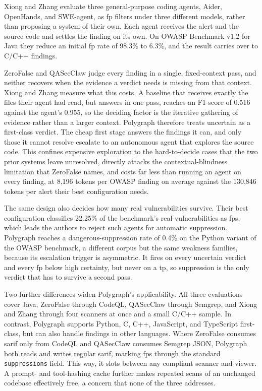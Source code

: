 Xiong and Zhang \cite{xiong2026} evaluate three general-purpose coding agents,
Aider, OpenHands, and SWE-agent, as \ac{fp} filters under three different
models, rather than proposing a system of their own. Each agent receives the
alert and the source code and settles the finding on its own. On OWASP Benchmark
v1.2 for Java they reduce an initial \ac{fp} rate of 98.3\% to 6.3\%, and the
result carries over to C/C++ findings.

ZeroFalse and QASecClaw judge every finding in a single, fixed-context pass, and
neither recovers when the evidence a verdict needs is missing from that context.
Xiong and Zhang measure what this costs. A baseline that receives exactly the
files their agent had read, but answers in one pass, reaches an F1-score of
0.516 against the agent's 0.955, so the deciding factor is the iterative
gathering of evidence rather than a larger context. Polygraph therefore treats
uncertain as a first-class verdict. The cheap first stage answers the findings
it can, and only those it cannot resolve escalate to an autonomous agent that
explores the source code. This confines expensive exploration to the
hard-to-decide cases that the two prior systems leave unresolved, directly
attacks the contextual-blindness limitation that ZeroFalse names, and costs far
less than running an agent on every finding, at 8,196 tokens per OWASP finding on average
against the 130,846 tokens per alert their best configuration needs.

The same design also decides how many real vulnerabilities survive. Their best
configuration classifies 22.25\% of the benchmark's real vulnerabilities as
\acp{fp}, which leads the authors to reject such agents for automatic suppression. Polygraph reaches a
dangerous-suppression rate of 0.4\% on the Python variant of the OWASP benchmark, a different corpus
but the same weakness families, because its escalation trigger is asymmetric. It
fires on every uncertain verdict and every \ac{fp} below high certainty, but
never on a \ac{tp}, so suppression is the only verdict that has to survive a
second pass.

Two further differences widen Polygraph's applicability. All three evaluations
cover Java, ZeroFalse through CodeQL, QASecClaw through Semgrep, and Xiong and
Zhang through four scanners at once and a small C/C++ sample. In contrast,
Polygraph supports Python, C, C++, JavaScript, and TypeScript first-class, but can
also handle findings in other languages. Where ZeroFalse consumes
\ac{sarif} only from CodeQL and QASecClaw consumes Semgrep JSON, Polygraph both reads and
writes regular \ac{sarif}, marking \acp{fp} through the standard
\texttt{suppressions} field. This way, it slots between any compliant scanner
and viewer. A prompt- and tool-hashing cache further makes repeated scans of an
unchanged codebase effectively free, a concern that none of the three addresses.

